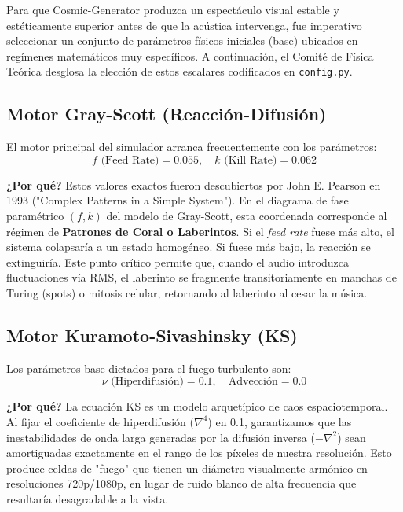 \documentclass[12pt]{book}
\begin{document}
Para que Cosmic-Generator produzca un espectáculo visual estable y estéticamente superior antes de que la acústica intervenga, fue imperativo seleccionar un conjunto de parámetros físicos iniciales (base) ubicados en regímenes matemáticos muy específicos. A continuación, el Comité de Física Teórica desglosa la elección de estos escalares codificados en \texttt{config.py}.

\subsection{Motor Gray-Scott (Reacción-Difusión)}
El motor principal del simulador arranca frecuentemente con los parámetros:
\begin{equation}
f \text{ (Feed Rate)} = 0.055, \quad k \text{ (Kill Rate)} = 0.062
\end{equation}

\textbf{¿Por qué?} Estos valores exactos fueron descubiertos por John E. Pearson en 1993 ("Complex Patterns in a Simple System"). En el diagrama de fase paramétrico $(f, k)$ del modelo de Gray-Scott, esta coordenada corresponde al régimen de \textbf{Patrones de Coral o Laberintos}. 
Si el \textit{feed rate} fuese más alto, el sistema colapsaría a un estado homogéneo. Si fuese más bajo, la reacción se extinguiría. Este punto crítico permite que, cuando el audio introduzca fluctuaciones vía RMS, el laberinto se fragmente transitoriamente en manchas de Turing (spots) o mitosis celular, retornando al laberinto al cesar la música.

\subsection{Motor Kuramoto-Sivashinsky (KS)}
Los parámetros base dictados para el fuego turbulento son:
\begin{equation}
\nu \text{ (Hiperdifusión)} = 0.1, \quad \text{Advección} = 0.0
\end{equation}

\textbf{¿Por qué?} La ecuación KS es un modelo arquetípico de caos espaciotemporal. Al fijar el coeficiente de hiperdifusión ($\nabla^4$) en 0.1, garantizamos que las inestabilidades de onda larga generadas por la difusión inversa ($-\nabla^2$) sean amortiguadas exactamente en el rango de los píxeles de nuestra resolución. Esto produce celdas de "fuego" que tienen un diámetro visualmente armónico en resoluciones 720p/1080p, en lugar de ruido blanco de alta frecuencia que resultaría desagradable a la vista.
\end{document}
